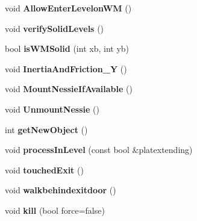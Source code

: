\begin{DoxyCompactItemize}
\item 
\hypertarget{class_c_player_afa3904a6a725f6c51f8122fa9ed4aa3b}{
void {\bfseries AllowEnterLevelonWM} ()}
\label{class_c_player_afa3904a6a725f6c51f8122fa9ed4aa3b}

\item 
\hypertarget{class_c_player_aa5b20113dcd666097a184ca30efe4d77}{
void {\bfseries verifySolidLevels} ()}
\label{class_c_player_aa5b20113dcd666097a184ca30efe4d77}

\item 
\hypertarget{class_c_player_a2abc457e2110abe546b44e44ebb2f6f6}{
bool {\bfseries isWMSolid} (int xb, int yb)}
\label{class_c_player_a2abc457e2110abe546b44e44ebb2f6f6}

\item 
\hypertarget{class_c_player_a8886c2cd449662d48679cf5e72626d58}{
void {\bfseries InertiaAndFriction\_\-Y} ()}
\label{class_c_player_a8886c2cd449662d48679cf5e72626d58}

\item 
\hypertarget{class_c_player_a8957fd89b557620e39fe4bb132fc862d}{
void {\bfseries MountNessieIfAvailable} ()}
\label{class_c_player_a8957fd89b557620e39fe4bb132fc862d}

\item 
\hypertarget{class_c_player_a53ca45acaf1dec5a3da4597b02f9f9ab}{
void {\bfseries UnmountNessie} ()}
\label{class_c_player_a53ca45acaf1dec5a3da4597b02f9f9ab}

\item 
\hypertarget{class_c_player_a78da931f0c5b5a5d3d211fa00b6f0293}{
int {\bfseries getNewObject} ()}
\label{class_c_player_a78da931f0c5b5a5d3d211fa00b6f0293}

\item 
\hypertarget{class_c_player_adcb23f96f44c519e5196dbece6628945}{
void {\bfseries processInLevel} (const bool \&platextending)}
\label{class_c_player_adcb23f96f44c519e5196dbece6628945}

\item 
\hypertarget{class_c_player_a2beacf2c5fb26fb98e34cbea7ab6fc91}{
void {\bfseries touchedExit} ()}
\label{class_c_player_a2beacf2c5fb26fb98e34cbea7ab6fc91}

\item 
\hypertarget{class_c_player_a009772e04f47412c3b58fc152f00bd99}{
void {\bfseries walkbehindexitdoor} ()}
\label{class_c_player_a009772e04f47412c3b58fc152f00bd99}

\item 
\hypertarget{class_c_player_ac09b8e8d07dd0d7be3a795997a203037}{
void {\bfseries kill} (bool force=false)}
\label{class_c_player_ac09b8e8d07dd0d7be3a795997a203037}


\end{DoxyCompactItemize}
